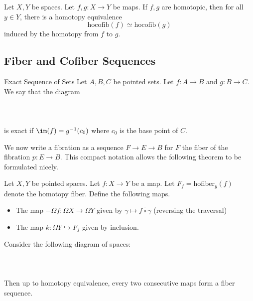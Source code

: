 \documentclass[a4paper]{article}
\begin{document}
\begin{prp}{}{} Let $X,Y$ be spaces. Let $f,g:X\to Y$ be maps. If $f,g$ are homotopic, then for all $y\in Y$, there is a homotopy equivalence $$\text{hocofib}(f)\simeq\text{hocofib}(g)$$ induced by the homotopy from $f$ to $g$. 
\end{prp}

\subsection{Fiber and Cofiber Sequences}
\begin{defn}{Exact Sequence of Sets}{} Let $A,B,C$ be pointed sets. Let $f:A\to B$ and $g:B\to C$. We say that the diagram \\~\\
\\~\\
is exact if $\im(f)=g^{-1}(c_0)$ where $c_0$ is the base point of $C$. 
\end{defn}

We now write a fibration as a sequence $F\to E\to B$ for $F$ the fiber of the fibration $p:E\to B$. This compact notation allows the following theorem to be formulated nicely. 

\begin{thm}{}{} Let $X,Y$ be pointed spaces. Let $f:X\to Y$ be a map. Let $F_f=\text{hofiber}_y(f)$ denote the homotopy fiber. Define the following maps. 
\begin{itemize}
\item The map $-\Omega f:\Omega X\to\Omega Y$ given by $\gamma\mapsto\overline{f\circ\gamma}$ (reversing the traversal)
\item The map $k:\Omega Y\hookrightarrow F_f$ given by inclusion. 
\end{itemize}
Consider the following diagram of spaces: \\~\\
\\~\\
Then up to homotopy equivalence, every two consecutive maps form a fiber sequence. 
\end{thm}
\end{document}
